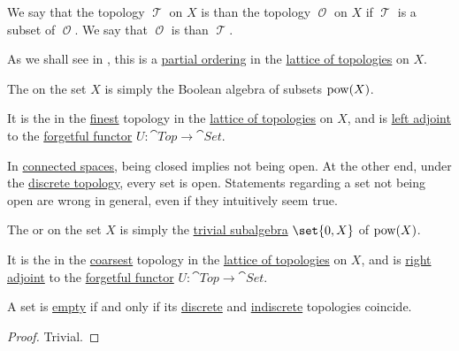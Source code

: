 \begin{definition}\label{def:topology_ordering}
  We say that the topology \( \mscrT \) on \( X \) is  than the topology \( \mscrO \) on \( X \) if \( \mscrT \) is a subset of \( \mscrO \). We say that \( \mscrO \) is  than \( \mscrT \).

  As we shall see in , this is a \hyperref[def:partially_ordered_set]{partial ordering} in the \hyperref[thm:lattice_of_topologies]{lattice of topologies} on \( X \).
\end{definition}

\begin{definition}\label{def:discrete_topology}
  The  on the set \( X \) is simply the Boolean algebra of subsets \( \operatorname{pow}(X) \).

  It is the in the \hyperref[def:topology_ordering]{finest} topology in the \hyperref[thm:lattice_of_topologies]{lattice of topologies} on \( X \), and is \hyperref[def:category_adjunction]{left adjoint} to the \hyperref[def:concrete_category]{forgetful functor} \( U: \cat{Top} \to \cat{Set} \).
\end{definition}

\begin{remark}\label{rem:discrete_topology_and_not_open_sets}
  In \hyperref[def:connected_space]{connected spaces}, being closed implies not being open. At the other end, under the \hyperref[def:discrete_topology]{discrete topology}, every set is open. Statements regarding a set not being open are wrong in general, even if they intuitively seem true.
\end{remark}

\begin{definition}\label{def:indiscrete_topology}
  The  or  on the set \( X \) is simply the \hyperref[def:boolean_algebra/trivial]{trivial subalgebra} \( \set{ 0, X } \) of \( \operatorname{pow}(X) \).

  It is the in the \hyperref[def:topology_ordering]{coarsest} topology in the \hyperref[thm:lattice_of_topologies]{lattice of topologies} on \( X \), and is \hyperref[def:category_adjunction]{right adjoint} to the \hyperref[def:concrete_category]{forgetful functor} \( U: \cat{Top} \to \cat{Set} \).
\end{definition}

\begin{proposition}\label{thm:empty_set_discrete_and_indiscrete_topologies}
  A set is \hyperref[def:empty_set]{empty} if and only if its \hyperref[def:discrete_topology]{discrete} and \hyperref[def:indiscrete_topology]{indiscrete} topologies coincide.
\end{proposition}
\begin{proof}
  Trivial.
\end{proof}

